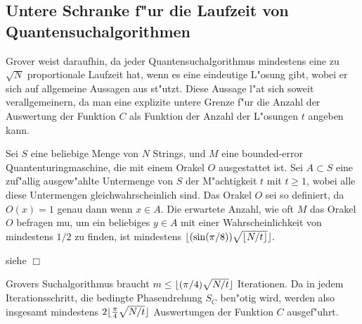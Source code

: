        \subsection{Untere Schranke f"ur die Laufzeit von Quantensuchalgorithmen}
         Grover weist daraufhin, da\3 jeder Quantensuchalgorithmus mindestens eine zu $\sqrt{N}$ proportionale Laufzeit hat, wenn es eine eindeutige L"osung gibt, wobei er
         sich auf allgemeine Aussagen aus \cite{bernstein} st"utzt. Diese Aussage l"a\3t sich soweit verallgemeinern, da\3 man eine explizite untere Grenze f"ur die
         Anzahl der Auswertung der Funktion $C$ als Funktion der Anzahl der L"osungen $t$ angeben kann. 
         \begin{satz}
           Sei $S$ eine beliebige Menge von $N$ Strings, und $M$ eine bounded-error Quantenturingmaschine, die mit einem Orakel $O$ ausgestattet ist. Sei $A\subset S$ eine
           zuf"allig ausgew"ahlte Untermenge von $S$ der M"achtigkeit $t$ mit $t\ge 1$, wobei alle diese Untermengen gleichwahrscheinlich sind. Das Orakel $O$ sei so definiert, 
           da\3 $O(x)=1$ genau dann wenn $x\in A$. Die erwartete Anzahl, wie oft $M$ das Orakel $O$ befragen mu\3, um ein beliebiges $y\in A $ mit einer Wahrscheinlichkeit von
           mindestens $1/2$ zu finden, ist mindestens $\lfloor (\sin(\pi/8))\sqrt{\lfloor N/t \rfloor} \rfloor.$
         \end{satz}
         \beweis siehe \cite{bernstein} \hfill $\Box$

         Grovers Suchalgorithmus braucht $m\le\lfloor (\pi/4)\sqrt{N/t} \rfloor$ Iterationen. Da in jedem Iterationsschritt, die bedingte Phasendrehung $S_C$ ben"otig wird, werden also
         insgesamt mindestens $2\lfloor \frac{\pi}{4}\sqrt{N/t} \rfloor$ Auswertungen der Funktion $C$ ausgef"uhrt. 

